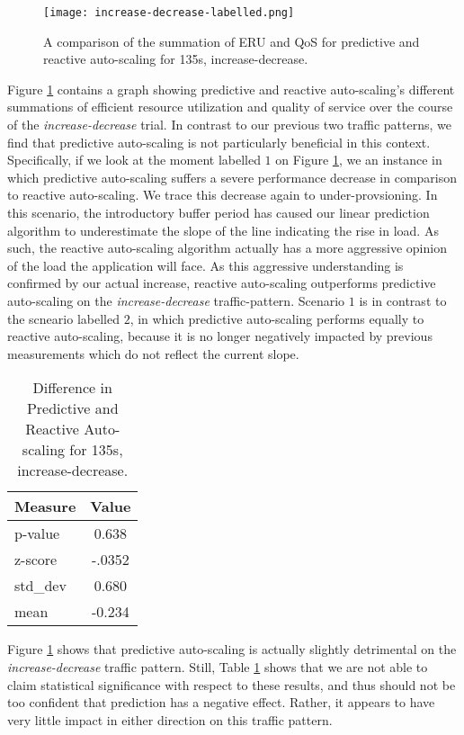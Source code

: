 \begin{figure}[!h]
  \centerline{\texttt{[image: increase-decrease-labelled.png]}}
  \caption{A comparison of the summation of ERU and QoS for
    predictive and reactive auto-scaling for 135s, increase-decrease.}
  \label{fig:135s-increase-decrease-labelled}
\end{figure}

Figure \ref{fig:135s-increase-decrease-labelled} contains a graph
showing predictive and reactive auto-scaling's different
summations of efficient resource utilization and quality of service over the
course of the \textit{increase-decrease} trial. In contrast to our previous two
traffic patterns, we find that predictive auto-scaling is not particularly
beneficial in this context. Specifically, if we look at the moment labelled
$1$ on Figure \ref{fig:135s-increase-decrease-labelled}, we an instance in which
predictive auto-scaling suffers a severe performance decrease in comparison to
reactive auto-scaling. We trace this decrease again to under-provsioning. In
this scenario, the introductory buffer period has caused our linear prediction
algorithm to underestimate the slope of the line indicating the rise in load. As
such, the reactive auto-scaling algorithm actually has a more aggressive opinion
of the load the application will face. As this aggressive understanding is
confirmed by our actual increase, reactive auto-scaling outperforms predictive
auto-scaling on the \textit{increase-decrease} traffic-pattern. Scenario
$1$ is in contrast to the scneario labelled $2$, in which predictive
auto-scaling performs equally to reactive auto-scaling, because it is no longer
negatively impacted by previous measurements which do not reflect the current
slope.

\begin{table}[htbp]
  \centering
  \caption{Difference in Predictive and Reactive Auto-scaling for 135s,
  increase-decrease.}
  \label{tab:135s-increase-decrease}
\begin{tabular}{l c}\hline\hline
    \multicolumn{1}{c}{\textbf{Measure}} & \textbf{Value} \\ \hline
     p-value & 0.638 \\
     z-score & -.0352 \\
     std\_dev & 0.680 \\
     mean & -0.234
  \end{tabular}
\end{table}

Figure \ref{fig:135s-increase-decrease-labelled} shows that predictive
auto-scaling is actually slightly detrimental on
the \textit{increase-decrease} traffic pattern.
Still, Table \ref{tab:135s-increase-decrease} shows that we are not able to claim
statistical significance with respect to these results, and thus should not be
too confident that prediction has a negative effect. Rather, it appears to
have very little impact in either direction on this traffic pattern.
